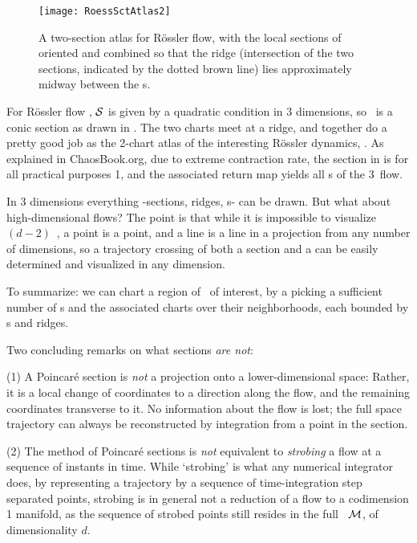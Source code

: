 \begin{figure}%
\begin{center}
  \texttt{[image: RoessSctAtlas2]}
\end{center}
  \caption{
  A two-section atlas for R\"ossler flow, with the local sections of
   oriented and combined so that
  the ridge (intersection of the two sections, indicated by the dotted
  brown line) lies  approximately midway between the \template s.
  } \label{fig:RoessBothEq}
\end{figure}


For R\"ossler flow , ${\cal S}$  is given by a
quadratic condition in 3 dimensions, so \poincBord\ is a conic section as
drawn in . The two
charts meet at a ridge, and together do a pretty good job as the 2-chart
atlas of the interesting R\"ossler dynamics, . As
explained in ChaosBook.org\cite{DasBuch}, due to extreme contraction rate, the section
in  is for all practical purposes 1\dmn, and the
associated return map yields all \po s of the 3\dmn\ flow.

In 3 dimensions everything -sections, ridges, \poincBord s-  can be
drawn. But what about high-dimensional flows? The point is that while it
is impossible to visualize  $(d\!-\!2)$\dmn\ {\poincBord}, a point is a
point, and a line is a line in a projection from any number of
dimensions, so a trajectory crossing of both a section and a {\poincBord}
can be easily determined and visualized in any dimension.

To summarize: we can chart a region of \statesp\ of interest, by a
picking a sufficient number of \template s and the associated charts over
their neighborhoods, each bounded by \poincBord s and ridges.

Two concluding remarks on what sections \emph{are not}:

(1) A Poincar\'e section is {\em not} a projection onto a
lower-dimensional space: Rather, it is a local change of coordinates to a
direction along the flow, and the remaining coordinates transverse to it.
No information about the flow is lost; the full space trajectory can
always be reconstructed by integration from a point in the section.

(2) The method of Poincar\'e sections is {\em not} equivalent to
\emph{strobing} a flow at a sequence of instants in time. While
`strobing' is what any numerical integrator does, by representing a
trajectory by a sequence of time-integration step separated points,
strobing is in general not a reduction of a flow to a codimension 1
manifold, as the sequence of strobed points still resides in the full
\statesp\ ${\cal M}$, of dimensionality $d$.
